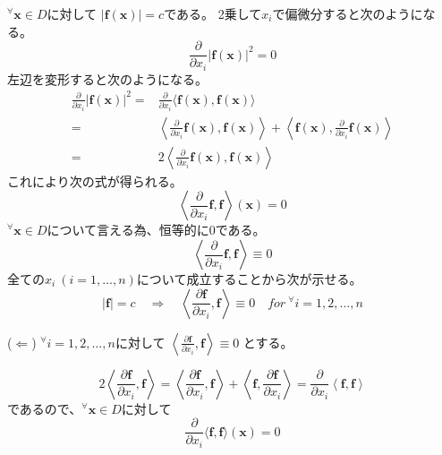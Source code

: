 \documentclass[12pt,b5paper]{ltjsarticle}
\begin{document}
\begin{enumerate}
\begin{enumerate}
            ${}^{\forall}\bm{x}\in D$に対して
            $\lvert \bm{f}(\bm{x}) \rvert = c$である。
            2乗して$x_i$で偏微分すると次のようになる。
            \begin{equation}
             \frac{\partial}{\partial x_i}\lvert \bm{f}(\bm{x}) \rvert^2 = 0
            \end{equation}
            左辺を変形すると次のようになる。
            \begin{align}
             \frac{\partial}{\partial x_i}\lvert \bm{f}(\bm{x}) \rvert^2
             =& \frac{\partial}{\partial x_i}\langle \bm{f}(\bm{x}), \bm{f}(\bm{x}) \rangle\\
             =& \left\langle \frac{\partial}{\partial x_i}\bm{f}(\bm{x}), \bm{f}(\bm{x}) \right\rangle
             + \left\langle \bm{f}(\bm{x}), \frac{\partial}{\partial x_i}\bm{f}(\bm{x}) \right\rangle\\
             =& 2\left\langle \frac{\partial}{\partial x_i}\bm{f}(\bm{x}), \bm{f}(\bm{x}) \right\rangle
            \end{align}
            これにより次の式が得られる。
            \begin{equation}
             \left\langle \frac{\partial}{\partial x_i}\bm{f}, \bm{f} \right\rangle(\bm{x}) =0
            \end{equation}
            ${}^{\forall}\bm{x}\in D$について言える為、恒等的に0である。
            \begin{equation}
             \left\langle \frac{\partial}{\partial x_i}\bm{f}, \bm{f} \right\rangle \equiv 0
            \end{equation}
            全ての$x_i \ (i=1,\dots,n)$について成立することから次が示せる。
            \begin{equation}
             \lvert \bm{f} \rvert = c
              \quad \Rightarrow \quad
               \left\langle \frac{\partial \bm{f}}{\partial x_i},\bm{f}\right\rangle
               \equiv 0
               \quad for \ {}^{\forall}i=1,2,\dots,n
            \end{equation}

            ($\Leftarrow$)
            ${}^{\forall}i=1,2,\dots,n$に対して
            $\left\langle \frac{\partial \bm{f}}{\partial x_i},\bm{f}\right\rangle \equiv 0$
            とする。

            \begin{equation}
             2\left\langle \frac{\partial \bm{f}}{\partial x_i},\bm{f}\right\rangle
             = \left\langle \frac{\partial \bm{f}}{\partial x_i},\bm{f}\right\rangle
             + \left\langle \bm{f}, \frac{\partial \bm{f}}{\partial x_i}\right\rangle
             = \frac{\partial}{\partial x_i}\left\langle \bm{f},\bm{f} \right\rangle
            \end{equation}
            であるので、${}^{\forall}\bm{x}\in D$に対して
            \begin{equation}
             \frac{\partial}{\partial x_i}\langle \bm{f},\bm{f}\rangle (\bm{x})=0
            \end{equation}


\end{enumerate}
\end{enumerate}
\end{document}
